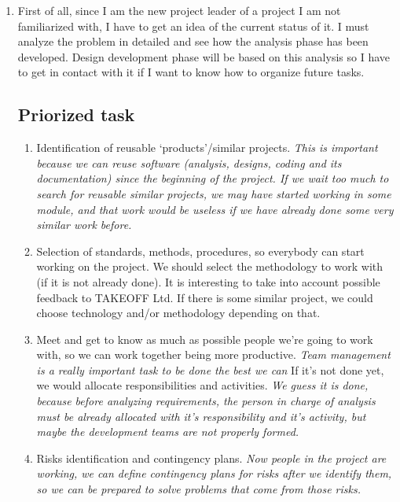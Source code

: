 \documentclass{article}
\begin{document}
\begin{enumerate}
\item First of all, since I am the new project leader of a project I am not familiarized with, I have to get an idea of the current status of it. I must analyze the problem in detailed and see how the analysis phase has been developed. Design development phase will be based on this analysis so I have to get in contact with it if I want to know how to organize future tasks. 


\subsection{Priorized task}
\begin{enumerate}
\item Identification of reusable ‘products’/similar projects. \textit{This is important because we can reuse software (analysis, designs, coding and its documentation) since the beginning of the project. If we wait too much to search for reusable similar projects,  we may have started working in some module, and that work would be useless if we have already done some very similar work before.}



\item Selection of standards, methods, procedures, so everybody can start working on the project. We should select the methodology to work with (if it is not already done). It is interesting to take into account possible feedback to TAKEOFF Ltd. If there is some similar project, we could choose technology and/or methodology depending on that.


\item Meet and get to know as much as possible people we're going to work with, so we can work together being more productive. \textit{Team management is a really important task to be done the best we can}
 If it's not done yet, we would allocate responsibilities and activities.
\textit{We guess it is done, because before analyzing requirements, the person in charge of analysis must be already allocated with it's responsibility and it's activity, but maybe the development teams are not properly formed.}

\item Risks identification and contingency plans. \textit{Now people in the project are working, we can define contingency plans for risks after we identify them, so we can be prepared to solve problems that come from those risks.}


\end{enumerate}
\end{enumerate}
\end{document}
